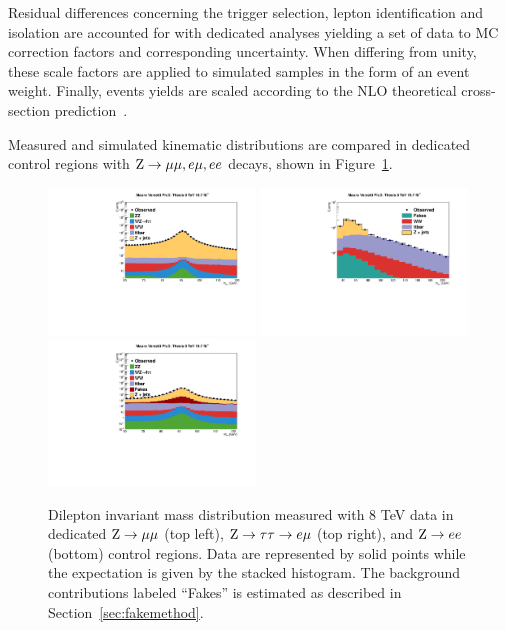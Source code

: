 Residual differences concerning the trigger selection, lepton identification and isolation are accounted for with dedicated analyses yielding a set of data to MC correction factors and corresponding uncertainty. When differing from unity, these scale factors are applied to simulated samples in the form of an event weight.
Finally, events yields are scaled according to the NLO theoretical cross-section prediction~\cite{MCFM}. 

Measured and simulated kinematic distributions are compared in dedicated control regions with $\mathrm{Z}\rightarrow\mu\mu,e\mu,ee$ decays, shown in Figure~\ref{fig:(dis)agreement}. %

\begin{figure}
\centering
\includegraphics[width=0.49\textwidth]{4_Analisys/pics/8TeV/plots/zmm/mass_rebin_log.pdf}
\includegraphics[width=0.49\textwidth]{4_Analisys/pics/8TeV/plots/em/mass_rebin_log-fakes.pdf}\\
\includegraphics[width=0.49\textwidth]{4_Analisys/pics/8TeV/plots/zee/mass_wfakes_log.pdf}
\caption{Dilepton invariant mass distribution measured with 8 TeV data in dedicated $\mathrm{Z}\rightarrow\mu\mu$ (top left), $\mathrm{Z}\rightarrow \tau\tau \rightarrow e\mu$ (top right), and $\mathrm{Z}\rightarrow ee$ (bottom) control regions. Data are represented by solid points while the expectation is given by the stacked histogram. The background contributions labeled ``Fakes'' is estimated as described in Section~\ref{sec:fakemethod}. %
}
\label{fig:(dis)agreement}
\end{figure}

